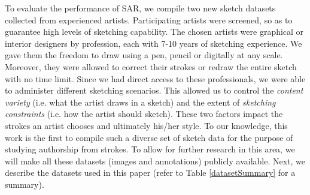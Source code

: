 To evaluate the performance of SAR, we compile two new sketch datasets collected from experienced artists. Participating artists were screened, so as to guarantee high levels of sketching capability. The chosen artists were graphical or interior designers by profession, each with 7-10 years of sketching experience. We gave them the freedom to draw using a pen, pencil or digitally at any scale. Moreover, they were allowed to correct their strokes or redraw the entire sketch with no time limit. Since we had direct access to these professionals, we were able to administer different sketching scenarios. This allowed us to control the \emph{content variety} (i.e. what the artist draws in a sketch) and the extent of \emph{sketching constraints} (i.e. how the artist should sketch). These two factors impact the strokes an artist chooses and ultimately his/her style. To our knowledge, this work is the first to compile such a diverse set of sketch data for the purpose of studying authorship from strokes. To allow for further research in this area, we will make all these datasets (images and annotations) publicly available. Next, we describe the datasets used in this paper (refer to Table \ref{datasetSummary} for a summary).



